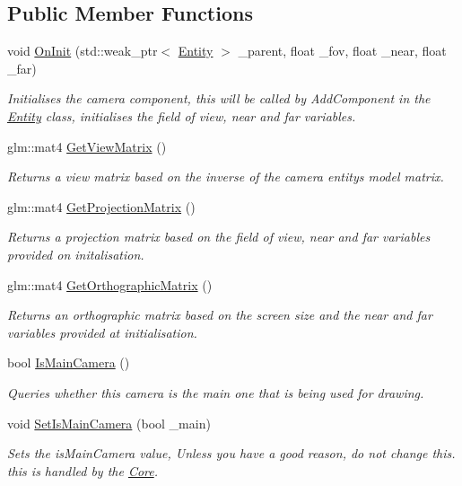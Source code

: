 \subsection*{Public Member Functions}
\begin{DoxyCompactItemize}
\item 
void \hyperlink{classfrontier_1_1_camera_a8f3aa751dc37b1167b643c6aa1923b26}{On\+Init} (std\+::weak\+\_\+ptr$<$ \hyperlink{classfrontier_1_1_entity}{Entity} $>$ \+\_\+parent, float \+\_\+fov, float \+\_\+near, float \+\_\+far)
\begin{DoxyCompactList}\small\item\em Initialises the camera component, this will be called by Add\+Component in the \hyperlink{classfrontier_1_1_entity}{Entity} class, initialises the field of view, near and far variables. \end{DoxyCompactList}\item 
glm\+::mat4 \hyperlink{classfrontier_1_1_camera_ad31e39125db73f05bfb9aabbf221c8e3}{Get\+View\+Matrix} ()
\begin{DoxyCompactList}\small\item\em Returns a view matrix based on the inverse of the camera entity\textquotesingle{}s model matrix. \end{DoxyCompactList}\item 
glm\+::mat4 \hyperlink{classfrontier_1_1_camera_a0332baf6ac3b2f062f6da519f6ae2b43}{Get\+Projection\+Matrix} ()
\begin{DoxyCompactList}\small\item\em Returns a projection matrix based on the field of view, near and far variables provided on initalisation. \end{DoxyCompactList}\item 
glm\+::mat4 \hyperlink{classfrontier_1_1_camera_a299ffcda274b10443e7f5dfe49a3866e}{Get\+Orthographic\+Matrix} ()
\begin{DoxyCompactList}\small\item\em Returns an orthographic matrix based on the screen size and the near and far variables provided at initialisation. \end{DoxyCompactList}\item 
bool \hyperlink{classfrontier_1_1_camera_abccd21681649a9474ac1708522a4b89d}{Is\+Main\+Camera} ()
\begin{DoxyCompactList}\small\item\em Queries whether this camera is the main one that is being used for drawing. \end{DoxyCompactList}\item 
void \hyperlink{classfrontier_1_1_camera_a177d7bf6ab9df81d673cef6489be156a}{Set\+Is\+Main\+Camera} (bool \+\_\+main)
\begin{DoxyCompactList}\small\item\em Sets the is\+Main\+Camera value, Unless you have a good reason, do not change this. this is handled by the \hyperlink{classfrontier_1_1_core}{Core}. \end{DoxyCompactList}\end{DoxyCompactItemize}
